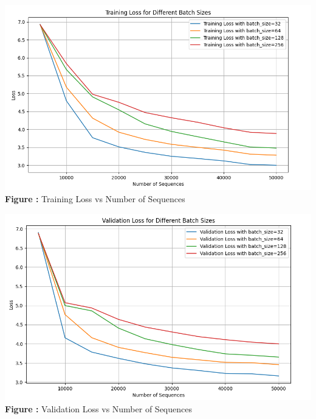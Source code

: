 \documentclass[11pt,addpoints,answers]{exam}
\begin{document}
\begin{questions}
\begin{parts}
\begin{subparts}
    \begin{your_solution}[height=7cm]
	\begin{minipage}{0.5\linewidth}
	\centering
	\includegraphics[width=\linewidth]{../handout/Q5_2_training.png}
	 \\ %
	{\tiny \textbf{Figure \thefigure:} Training Loss vs Number of Sequences}  %
	\label{fig:Q5_2_training}         %
	\end{minipage}
\hfill
	\begin{minipage}{0.5\linewidth}
	\centering
	\includegraphics[width=\linewidth]{../handout/Q5_2_validation.png}
	 \\ %
	{\tiny \textbf{Figure \thefigure:} Validation Loss vs Number of Sequences} %
	\label{fig:Q5_2_validation}         %
	\end{minipage}        
    \end{your_solution}
    

\end{subparts}
\end{parts}
\end{questions}
\end{document}
